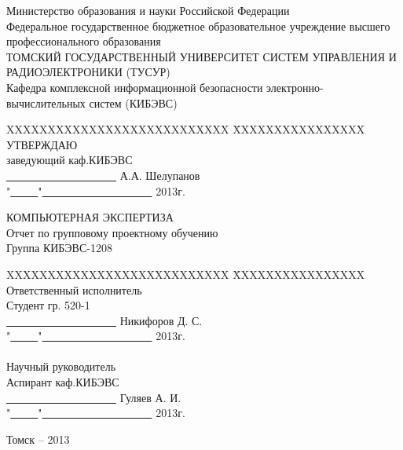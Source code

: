 \documentclass[russian,utf8,14pt,simple]{eskdtext}
\begin{document}
\newpage
{}

\begin{center}
Министерство образования и науки Российской Федерации\\
Федеральное государственное бюджетное образовательное учреждение высшего профессионального образования\\
ТОМСКИЙ ГОСУДАРСТВЕННЫЙ УНИВЕРСИТЕТ СИСТЕМ УПРАВЛЕНИЯ И РАДИОЭЛЕКТРОНИКИ (ТУСУР)\\
Кафедра комплексной информационной безопасности электронно-вычислительных систем (КИБЭВС)\\
\end{center}

\begin{tabbing}
XXXXXXXXXXXXXXXXXXXXXXXXXXX \=
XXXXXXXXXXXXXXXX\kill
\> УТВЕРЖДАЮ\\
\> заведующий каф.КИБЭВС\\
\> \underline{\ \ \ \ \ \ \ \ \ \ \ \ \ \ \ \ \ \ \ \ } А.А. Шелупанов\\
\> "\underline{\ \ \ \ \ }"\underline{\ \ \ \ \ \ \ \ \ \ \ \ \ \ \ \ \ \ \ \ } 2013г.\\
\end{tabbing}

\begin{center}
КОМПЬЮТЕРНАЯ ЭКСПЕРТИЗА\\
Отчет по групповому проектному обучению\\
Группа КИБЭВС-1208\\
\end{center}

\begin{tabbing}
XXXXXXXXXXXXXXXXXXXXXXXXXXX \=
XXXXXXXXXXXXXXXX\kill
\> Ответственный исполнитель\\
\> Студент гр. 520-1\\
\> \underline{\ \ \ \ \ \ \ \ \ \ \ \ \ \ \ \ \ \ \ \ } Никифоров Д. С.\\
\> "\underline{\ \ \ \ \ }"\underline{\ \ \ \ \ \ \ \ \ \ \ \ \ \ \ \ \ \ \ \ } 2013г.\\
\ \\
\> Научный руководитель\\
\> Аспирант каф.КИБЭВС\\
\> \underline{\ \ \ \ \ \ \ \ \ \ \ \ \ \ \ \ \ \ \ \ } Гуляев А. И.\\
\> "\underline{\ \ \ \ \ }"\underline{\ \ \ \ \ \ \ \ \ \ \ \ \ \ \ \ \ \ \ \ } 2013г.\\
\end{tabbing}
\vfill
\begin{center}
Томск -- 2013
\end{center}
\end{document}
